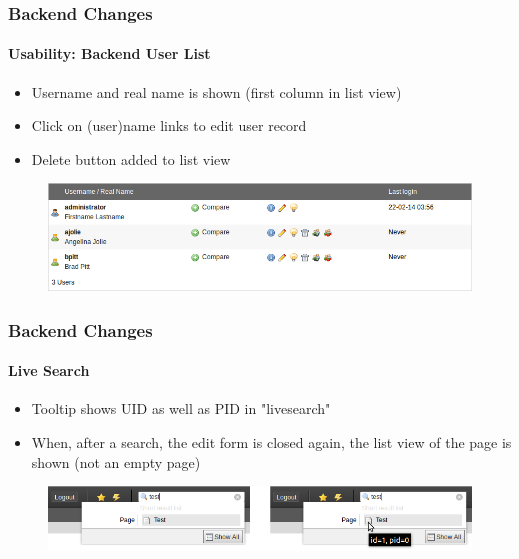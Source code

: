 
\begin{frame}[fragile]
	\frametitle{Backend Changes}
	\framesubtitle{Usability: Backend User List}

	\begin{itemize}
		\item Username and real name is shown (first column in list view)
		\item Click on (user)name links to edit user record
		\item Delete button added to list view

	\end{itemize}

	\begin{figure}
		\includegraphics[width=0.95\linewidth]{Images/BackendChanges/BackendUserList.png}
	\end{figure}

\end{frame}


\begin{frame}[fragile]
	\frametitle{Backend Changes}
	\framesubtitle{Live Search}

	\begin{itemize}
		\item Tooltip shows UID as well as PID in "livesearch"
		\item When, after a search, the edit form is closed again, the list view of the page is shown (not an empty page)
	\end{itemize}

	\begin{figure}
		\includegraphics[width=0.8\linewidth]{Images/BackendChanges/LiveSearchTooltip.png}
	\end{figure}

\end{frame}

